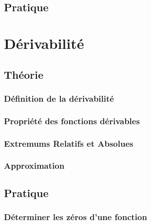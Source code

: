 \documentclass{article}
\begin{document}
\subsection{Pratique}

\section{Dérivabilité}

\subsection{Théorie}

\subsubsection{Définition de la dérivabilité}

\subsubsection{Propriété des fonctions dérivables}




\subsubsection{Extremums Relatifs et Absolues}

\subsubsection{Approximation}




\subsection{Pratique}

\subsubsection{Déterminer les zéros d'une fonction}
\end{document}
